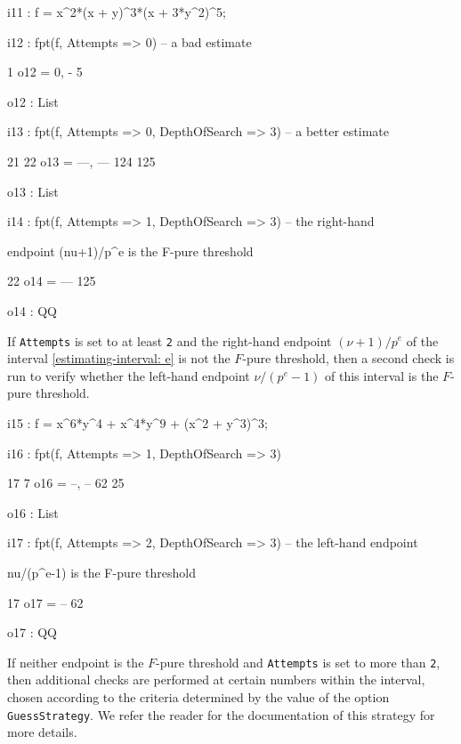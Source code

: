 \documentclass{amsart}
\begin{document}
{\small
{}
\begin{MyVerbatim}

i11 : f = x^2*(x + y)^3*(x + 3*y^2)^5;

i12 : fpt(f, Attempts => 0) -- a bad estimate

          1
o12 = {0, -}
          5

o12 : List

i13 : fpt(f, Attempts => 0, DepthOfSearch => 3) -- a better estimate

        21   22
o13 = {---, ---}
       124  125

o13 : List

i14 : fpt(f, Attempts => 1, DepthOfSearch => 3) -- the right-hand

      endpoint (nu+1)/p^e is the F-pure threshold

       22
o14 = ---
      125

o14 : QQ

\end{MyVerbatim}
}

If  {\tt Attempts} is set to at least {\tt 2} and the right-hand endpoint $(\nu+1)/p^e$ of the interval \eqref{estimating-interval: e} is not the $F$-pure threshold, then a second check is run to verify whether the left-hand endpoint $\nu/(p^e-1)$ of this interval is the $F$-pure threshold.

{\small
{}
\begin{MyVerbatim}

i15 : f = x^6*y^4 + x^4*y^9 + (x^2 + y^3)^3;

i16 : fpt(f, Attempts => 1, DepthOfSearch => 3)

       17   7
o16 = {--, --}
       62  25

o16 : List

i17 : fpt(f, Attempts => 2, DepthOfSearch => 3) -- the left-hand endpoint

      nu/(p^e-1) is the F-pure threshold

      17
o17 = --
      62

o17 : QQ

\end{MyVerbatim}
}

If neither endpoint is the $F$-pure threshold and {\tt Attempts} is set to more than {\tt 2}, then  additional checks are performed at certain numbers within the interval, chosen according to the criteria determined by the value of the option {\tt GuessStrategy}.  We refer the reader for the documentation of this strategy for more details.
\end{document}
